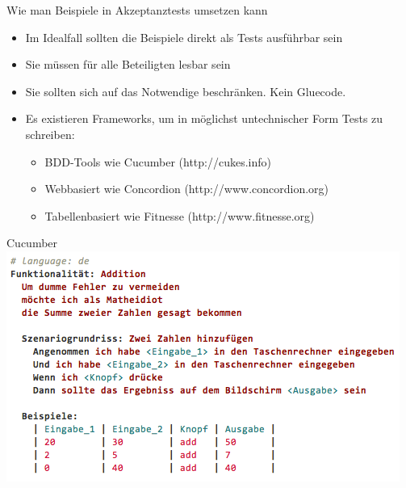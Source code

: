 \begin{frame}{Wie man Beispiele in Akzeptanztests umsetzen kann}

\begin{itemize}
	\item Im Idealfall sollten die Beispiele direkt als Tests ausführbar sein
	\item Sie müssen für alle Beteiligten lesbar sein
	\item Sie sollten sich auf das Notwendige beschränken. Kein Gluecode.
	\item Es existieren Frameworks, um in möglichst \glqq untechnischer\grqq{} Form Tests zu schreiben:
	\begin{itemize}
		\item BDD-Tools wie Cucumber (http://cukes.info)
		\item Webbasiert wie Concordion (http://www.concordion.org)
		\item Tabellenbasiert wie Fitnesse (http://www.fitnesse.org)
	\end{itemize}
\end{itemize}

\end{frame}


\begin{frame}{Cucumber}
\includegraphics[width=\textwidth]{Cucumber.png} \newline
\end{frame}


